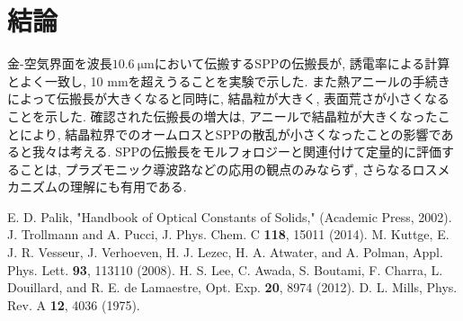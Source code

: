 \documentclass[a4,10truept]{jsarticle}
\begin{document}
\vspace{-0.7em}
\section{結論}
\vspace{-0.7em}
金-空気界面を波長$10.6\:\mathrm{\mu m}$において伝搬するSPPの伝搬長が, 誘電率による計算とよく一致し, 10 mmを超えうることを実験で示した. また熱アニールの手続きによって伝搬長が大きくなると同時に, 結晶粒が大きく, 表面荒さが小さくなることを示した. 確認された伝搬長の増大は, アニールで結晶粒が大きくなったことにより, 結晶粒界でのオームロスとSPPの散乱が小さくなったことの影響であると我々は考える. SPPの伝搬長をモルフォロジーと関連付けて定量的に評価することは, プラズモニック導波路などの応用の観点のみならず, さらなるロスメカニズムの理解にも有用である. 

%
%
\vspace{-0.7em}
\begin{thebibliography}{9}
\vspace{-0.7em}
 E. D. Palik, "Handbook of Optical Constants of Solids," (Academic Press, 2002).
 J. Trollmann and A. Pucci, J. Phys. Chem. C {\bf 118}, 15011 (2014).
 M. Kuttge, E. J. R. Vesseur, J. Verhoeven, H. J. Lezec, H. A. Atwater, and A. Polman, Appl. Phys. Lett. {\bf 93}, 113110 (2008).
 H. S. Lee, C. Awada, S. Boutami, F. Charra, L. Douillard, and R. E. de Lamaestre, Opt. Exp. {\bf 20}, 8974 (2012).
 D. L. Mills, Phys. Rev. A {\bf 12}, 4036 (1975).
\end{thebibliography}
\end{document}
